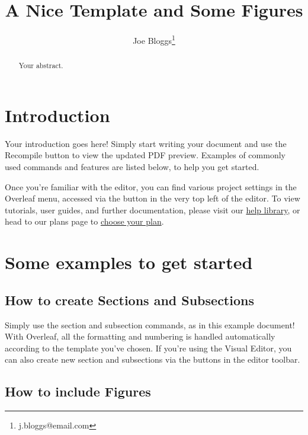 \documentclass[twocolumn, 9pt]{extarticle}
\begin{document}
\title{A Nice Template and Some Figures}

\author[1, 2]{Joe Bloggs\thanks{j.bloggs@email.com}}


\setcounter{Maxaffil}{0}
\renewcommand\Affilfont{\itshape\small}

\date{}  
\maketitle


\begin{abstract}
Your abstract.
\end{abstract}

\section{Introduction}

Your introduction goes here! Simply start writing your document and use the Recompile button to view the updated PDF preview. Examples of commonly used commands and features are listed below, to help you get started.

Once you're familiar with the editor, you can find various project settings in the Overleaf menu, accessed via the button in the very top left of the editor. To view tutorials, user guides, and further documentation, please visit our \href{https://www.overleaf.com/learn}{help library}, or head to our plans page to \href{https://www.overleaf.com/user/subscription/plans}{choose your plan}.

\section{Some examples to get started}

\subsection{How to create Sections and Subsections}

Simply use the section and subsection commands, as in this example document! With Overleaf, all the formatting and numbering is handled automatically according to the template you've chosen. If you're using the Visual Editor, you can also create new section and subsections via the buttons in the editor toolbar.

\subsection{How to include Figures}
\end{document}
